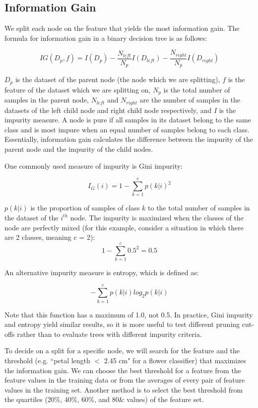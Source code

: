 \documentclass{article}
\begin{document}
\subsection{Information Gain}
We split each node on the feature that yields the most information gain. The formula for information gain in a binary decision tree is as follows:

\[IG(D_p, f) = I(D_p) - \frac{N_{left}}{N_p}I(D_{left}) - \frac{N_{right}}{N_p}I(D_{right}) \]

$D_p$ is the dataset of the parent node (the node which we are splitting), $f$ is the feature of the dataset which we are splitting on, $N_p$ is the total number of samples in the parent node, $N_{left}$ and $N_{right}$ are the number of samples in the datasets of the left child node and right child node respectively, and $I$ is the impurity measure. A node is pure if all samples in its dataset belong to the same class and is most impure when an equal number of samples belong to each class. Essentially, information gain calculates the difference between the impurity of the parent node and the impurity of the child nodes.

One commonly used measure of impurity is Gini impurity:

\[I_G(i) = 1 - \sum_{k=1}^{c} p(k|i)^2 \]

$p(k|i)$ is the proportion of samples of class \(k\) to the total number of samples in the dataset of the $i^{th}$ node.
The impurity is maximized when the classes of the node are perfectly mixed (for this example, consider a situation in which there are 2 classes, meaning c = 2):
\[1 - \sum_{k=1}^{c} 0.5^2 = 0.5\]

An alternative impurity measure is entropy, which is defined as:

\[-\sum_{k=1}^{c} p(k|i)log_2{p(k|i)} \]

Note that this function has a maximum of 1.0, not 0.5. In practice, Gini impurity and entropy yield similar results, so it is more useful to test different pruning cut-offs rather than to evaluate trees with different impurity criteria.

To decide on a split for a specific node, we will search for the feature and the threshold (e.g. ``petal length $<$ 2.45 cm" for a flower classifier) that maximizes the information gain. We can choose the best threshold for a feature from the feature values in the training data or from the averages of every pair of feature values in the training set. Another method is to select the best threshold from the quartiles (20\%, 40\%, 60\%, and 80\& values) of the feature set. 
\end{document}
